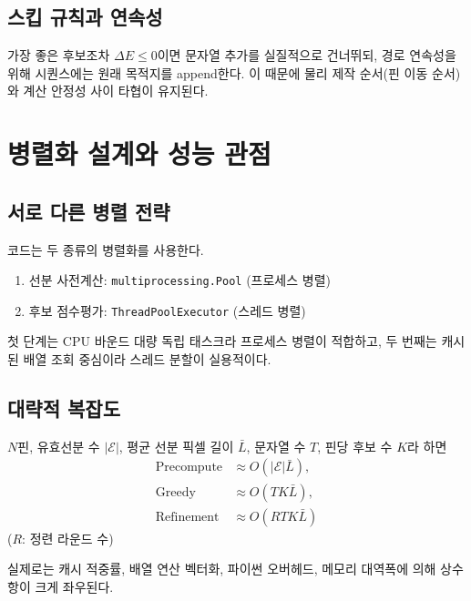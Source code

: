 \documentclass[11pt,a4paper]{article}
\begin{document}
\subsection{스킵 규칙과 연속성}
가장 좋은 후보조차 \(\Delta E\le 0\)이면 문자열 추가를 실질적으로 건너뛰되,
경로 연속성을 위해 시퀀스에는 원래 목적지를 append한다.
이 때문에 물리 제작 순서(핀 이동 순서)와 계산 안정성 사이 타협이 유지된다.

\section{병렬화 설계와 성능 관점}
\subsection{서로 다른 병렬 전략}
코드는 두 종류의 병렬화를 사용한다.
\begin{enumerate}
  \item 선분 사전계산: \texttt{multiprocessing.Pool} (프로세스 병렬)
  \item 후보 점수평가: \texttt{ThreadPoolExecutor} (스레드 병렬)
\end{enumerate}
첫 단계는 CPU 바운드 대량 독립 태스크라 프로세스 병렬이 적합하고,
두 번째는 캐시된 배열 조회 중심이라 스레드 분할이 실용적이다.

\subsection{대략적 복잡도}
\(N\)핀, 유효선분 수 \(|\mathcal E|\), 평균 선분 픽셀 길이 \(\bar L\),
문자열 수 \(T\), 핀당 후보 수 \(K\)라 하면
\begin{align}
\text{Precompute} &\approx O(|\mathcal E|\bar L),\\
\text{Greedy} &\approx O(TK\bar L),\\
\text{Refinement} &\approx O(RTK\bar L)
\end{align}
(\(R\): 정련 라운드 수)

실제로는 캐시 적중률, 배열 연산 벡터화, 파이썬 오버헤드,
메모리 대역폭에 의해 상수항이 크게 좌우된다.
\end{document}
